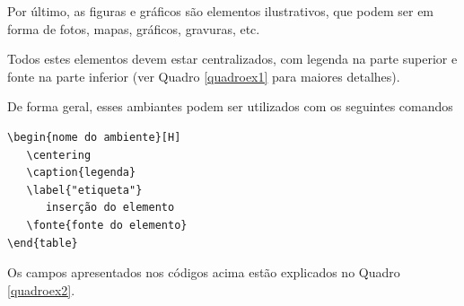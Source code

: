Por último, as figuras e gráficos são elementos ilustrativos, que podem ser em forma de fotos, mapas, gráficos, gravuras, etc.

Todos estes elementos devem estar centralizados, com legenda na parte superior e fonte na parte inferior (ver Quadro \ref{quadroex1} para maiores detalhes).

De forma geral, esses ambiantes podem ser utilizados com os seguintes comandos



\begin{verbatim}
\begin{nome do ambiente}[H]
   \centering
   \caption{legenda}
   \label{"etiqueta"}
      inserção do elemento 
   \fonte{fonte do elemento}
\end{table}
\end{verbatim}
Os campos apresentados nos códigos acima estão explicados no Quadro \ref{quadroex2}.


